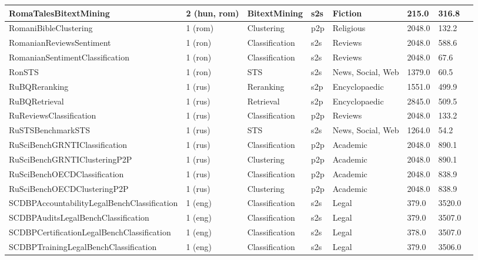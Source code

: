 \begin{longtable}{L{5.0cm}|L{1.5cm}L{1.4cm}L{1.4cm}L{1.4cm}L{1.4cm}L{1.0cm}L{1.0cm}}
 \hline 
RomaTalesBitextMining  & 2 (hun, rom) & BitextMining & s2s & Fiction & 215.0 & 316.8 \\
 \hline 
RomaniBibleClustering  & 1 (rom) & Clustering & p2p & Religious & 2048.0 & 132.2 \\
 \hline 
RomanianReviewsSentiment \cite{tache2101clustering} & 1 (ron) & Classification & s2s & Reviews & 2048.0 & 588.6 \\
 \hline 
RomanianSentimentClassification \cite{dumitrescu2020birth} & 1 (ron) & Classification & s2s & Reviews & 2048.0 & 67.6 \\
 \hline 
RonSTS \cite{dumitrescu2021liro} & 1 (ron) & STS & s2s & News, Social, Web & 1379.0 & 60.5 \\
 \hline 
RuBQReranking \cite{RuBQ2021} & 1 (rus) & Reranking & s2p & Encyclopaedic & 1551.0 & 499.9 \\
 \hline 
RuBQRetrieval \cite{RuBQ2021} & 1 (rus) & Retrieval & s2p & Encyclopaedic & 2845.0 & 509.5 \\
 \hline 
RuReviewsClassification \cite{Smetanin-SA-2019} & 1 (rus) & Classification & p2p & Reviews & 2048.0 & 133.2 \\
 \hline 
RuSTSBenchmarkSTS \cite{huggingface:dataset:stsb_multi_mt} & 1 (rus) & STS & s2s & News, Social, Web & 1264.0 & 54.2 \\
 \hline 
RuSciBenchGRNTIClassification  & 1 (rus) & Classification & p2p & Academic & 2048.0 & 890.1 \\
 \hline 
RuSciBenchGRNTIClusteringP2P  & 1 (rus) & Clustering & p2p & Academic & 2048.0 & 890.1 \\
 \hline 
RuSciBenchOECDClassification  & 1 (rus) & Classification & p2p & Academic & 2048.0 & 838.9 \\
 \hline 
RuSciBenchOECDClusteringP2P  & 1 (rus) & Clustering & p2p & Academic & 2048.0 & 838.9 \\
 \hline 
SCDBPAccountabilityLegalBenchClassification \cite{guha2023legalbench} & 1 (eng) & Classification & s2s & Legal & 379.0 & 3520.0 \\
 \hline 
SCDBPAuditsLegalBenchClassification \cite{guha2023legalbench} & 1 (eng) & Classification & s2s & Legal & 379.0 & 3507.0 \\
 \hline 
SCDBPCertificationLegalBenchClassification \cite{guha2023legalbench} & 1 (eng) & Classification & s2s & Legal & 378.0 & 3507.0 \\
 \hline 
SCDBPTrainingLegalBenchClassification \cite{guha2023legalbench} & 1 (eng) & Classification & s2s & Legal & 379.0 & 3506.0 \\

\end{longtable}
